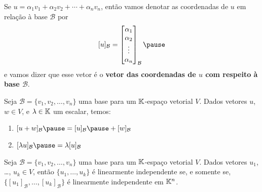 \documentclass{beamer}
\begin{document}
\begin{frame}
  \begin{notacao}
    Se $u = \alpha_1v_1 + \alpha_2v_2 + \cdots + \alpha_nv_n$, \pause então vamos denotar as coordenadas de $u$ \pause em relação à base $\mathcal{B}$ por\pause
    \[
      [u]_\mathcal{B} = \begin{bmatrix}\alpha_1\\\alpha_2\\ \vdots\\ \alpha_n\end{bmatrix}_\mathcal{B}\pause
    \]
    e vamos dizer que esse vetor \pause é o \textbf{vetor das coordenadas de $u$ com respeito à base $\mathcal{B}$}.
  \end{notacao}
\end{frame}

\begin{frame}
  \begin{teorema}
    Seja $\mathcal{B} = \{v_1, v_2, \dots, v_n\}$ uma base \pause para um $\mathbb{K}$-espaço vetorial $V$. \pause Dados vetores $u$, $w \in V$, \pause e $\lambda \in \mathbb{K}$ um escalar, temos: \pause
    \begin{enumerate}[label={\roman*})]
      \vspace{.2cm}

      \item $[u + w]_\mathcal{B} \pause = [u]_\mathcal{B} \pause + [w]_\mathcal{B}$ \pause

      \vspace{1cm}

      \item $[\lambda u]_\mathcal{B} \pause = \lambda[u]_\mathcal{B}$
    \end{enumerate}
  \end{teorema}
\end{frame}

\begin{frame}
  \begin{teorema}
    Seja $\mathcal{B} = \{v_1, v_2, \dots, v_n\}$ uma base \pause para um $\mathbb{K}$-espaço vetorial $V$. \pause Dados vetores $u_1$, \dots, $u_k \in V$, \pause então $\{u_1, \dots, u_k\}$ é linearmente independente \pause se, e somente se, \pause $\{[u_1]_\mathcal{B}, \dots, [u_k]_\mathcal{B}\}$ \pause é linearmente independente em $\mathbb{K}^n$.
  \end{teorema}
\end{frame}
\end{document}
